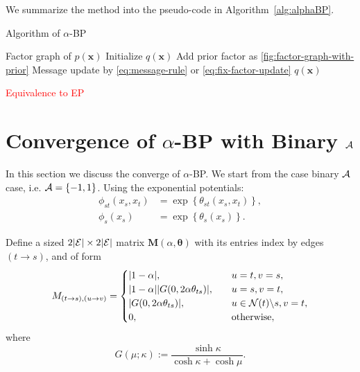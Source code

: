 \documentclass[conference,onecolumn]{IEEEtran}
\begin{document}
We summarize the method into the pseudo-code in Algorithm~\autoref{alg:alphaBP}.
\begin{algorithm}
  \caption{Algorithm of $\alpha$-BP}\label{alg:alphaBP}
  \begin{algorithmic}[1]
    \renewcommand{\algorithmicrequire}{\textbf{Input:}}
    \renewcommand{\algorithmicensure}{\textbf{Output:}}
    \REQUIRE Factor graph of $p(\bm{x})$
    \STATE Initialize $q(\bm{x})$
    \STATE Add prior factor as \autoref{fig:factor-graph-with-prior}
    \ENDIF
    \STATE Message update by \autoref{eq:message-rule} or \autoref{eq:fix-factor-update}
    \ENDFOR
    \ENDWHILE
    \RETURN $q(\bm{x})$ 
  \end{algorithmic} 
\end{algorithm}

\textcolor{red}{Equivalence to EP}
\section{Convergence of $\alpha$-BP with Binary $\mathcal{A}$}
In this section we discuss the converge of $\alpha$-BP. We start from
the case binary $\mathcal{A}$ case, i.e. $\mathcal{A}=\left\{ -1, 1 \right\}$. Using the exponential potentials:
\begin{align}
  \phi_{st}(x_s, x_t) &= \exp\left\{ \theta_{st}(x_s, x_t)\right\}, \\
  \phi_{s}(x_s) &= \exp\left\{ \theta_{s}(x_s) \right\}.
\end{align}

Define a sized $2| \mathcal{E} | \times 2| \mathcal{E} |$ matrix $\bm{M}(\alpha, \bm{\theta})$ with its entries index by edges $(t\rightarrow s)$, and of form
\begin{equation}
  M_{(t\rightarrow s), (u \rightarrow v)} =
  \begin{cases}
    |  1 - \alpha |, &\quad u=t, v=s, \\
    |  1 - \alpha | | G(0, 2 \alpha \theta_{ts}) |, & \quad u = s, v =t, \\
    | G(0, 2 \alpha \theta_{ts}) |, & \quad u \in \mathcal{N}(t)\backslash s, v = t, \\
    0, & \quad \mathrm{otherwise},
  \end{cases}
\end{equation}
where
\begin{equation}
  G(\mu; \kappa) := \frac{\sinh{\kappa}}{\cosh{\kappa} + \cosh{\mu}}.
\end{equation}
\end{document}
